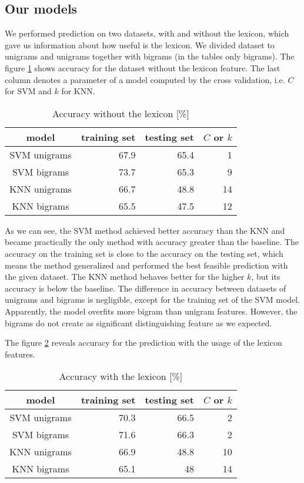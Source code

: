 \documentclass{sig-alternate}
\begin{document}
\subsection{Our models}
We performed prediction on two datasets, with and without the lexicon, which gave us information about how useful is the lexicon.
We divided dataset to unigrams and unigrams together with bigrams (in the tables only bigrams).
The figure \ref{without} shows accuracy for the dataset without the lexicon feature.
The last column denotes a parameter of a model computed by the cross validation, i.e. $C$ for SVM and $k$ for KNN.

\begin{table}[h]
\centering
\caption{Accuracy without the lexicon [\%]}
\label{without}
\begin{tabular}{|c|r|r|r|} \hline
model & training set & testing set & $C$ or $k$  \\ \hline
SVM unigrams & 67.9 & 65.4 & 1 \\ \hline
SVM bigrams & 73.7 & 65.3 & 9 \\ \hline
KNN unigrams & 66.7 & 48.8 & 14 \\ \hline
KNN bigrams & 65.5 & 47.5 & 12 \\ \hline
\end{tabular}
\end{table}

As we can see, the SVM method achieved better accuracy than the KNN and became practically the only method with accuracy greater than the baseline.
The accuracy on the training set is close to the accuracy on the testing set, which means the method generalized and performed the best feasible prediction with the given dataset.
The KNN method behaves better for the higher $k$, but its accuracy is below the baseline.
The difference in accuracy between datasets of unigrams and bigrams is negligible, except for the training set of the SVM model.
Apparently, the model overfits more bigram than unigram features.
However, the bigrams do not create as significant distinguishing feature as we expected.

The figure \ref{with} reveals accuracy for the prediction with the usage of the lexicon features.

\begin{table}[h]
\centering
\caption{Accuracy with the lexicon [\%]}
\label{with}
\begin{tabular}{|c|r|r|r|} \hline
model & training set & testing set  & $C$ or $k$\\ \hline
SVM unigrams & 70.3 & 66.5 & 2 \\ \hline
SVM bigrams & 71.6 & 66.3 & 2 \\ \hline
KNN unigrams & 66.9 & 48.8 & 10\\ \hline
KNN bigrams & 65.1 & 48 & 14 \\ \hline
\end{tabular}
\end{table}
\end{document}
